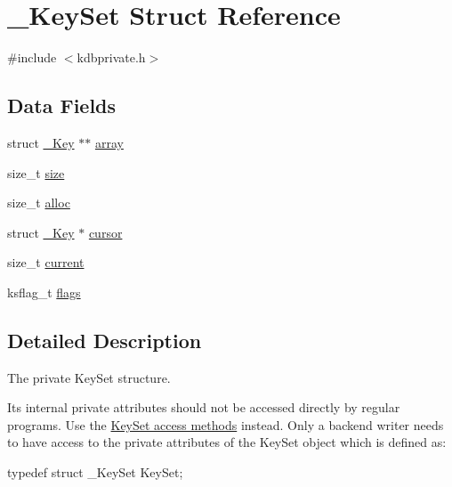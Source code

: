 \hypertarget{struct__KeySet}{
\section{\_\-KeySet Struct Reference}
\label{struct__KeySet}
}


{\ttfamily \#include $<$kdbprivate.h$>$}

\subsection*{Data Fields}
\begin{DoxyCompactItemize}
\item 
struct \hyperlink{struct__Key}{\_\-Key} $\ast$$\ast$ \hyperlink{struct__KeySet_ae1d1a4e056f483d59503d85d639e186b}{array}
\item 
size\_\-t \hyperlink{struct__KeySet_aecb83d70eff913f1332593c179185125}{size}
\item 
size\_\-t \hyperlink{struct__KeySet_ac421dbe2138bb4317996a480a6dae904}{alloc}
\item 
struct \hyperlink{struct__Key}{\_\-Key} $\ast$ \hyperlink{struct__KeySet_ae1f826d1e8848e43e4432d1bc8316e65}{cursor}
\item 
size\_\-t \hyperlink{struct__KeySet_a68da1e55ecaf7e8d555cf61c8fda95d9}{current}
\item 
ksflag\_\-t \hyperlink{struct__KeySet_aa8da9b8e25533547f9eeb4e5c3227c74}{flags}
\end{DoxyCompactItemize}


\subsection{Detailed Description}
The private KeySet structure.

Its internal private attributes should not be accessed directly by regular programs. Use the \hyperlink{group__keyset}{KeySet access methods} instead. Only a backend writer needs to have access to the private attributes of the KeySet object which is defined as: 
\begin{DoxyCode}
typedef struct _KeySet KeySet;
\end{DoxyCode}
 

